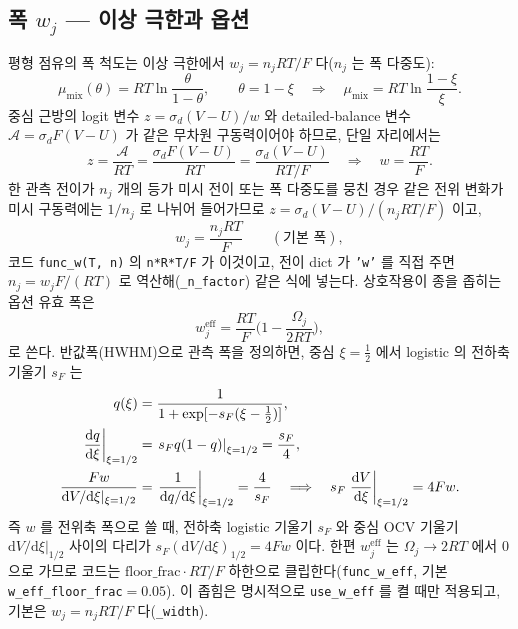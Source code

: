 \documentclass[11pt,a4paper]{article}
\newcommand{\dd}{\mathrm{d}}
\newcommand{\eff}{\mathrm{eff}}
\newcommand{\code}[1]{\texttt{#1}}
\begin{document}
\subsection{폭 $w_j$ — 이상 극한과 옵션}
평형 점유의 폭 척도는 이상 극한에서 $w_j=n_jRT/F$ 다($n_j$ 는 폭 다중도):
\begin{equation}
\mu_{\mathrm{mix}}(\theta)=RT\ln\frac{\theta}{1-\theta},\qquad
\theta=1-\xi
\quad\Longrightarrow\quad
\mu_{\mathrm{mix}}=RT\ln\frac{1-\xi}{\xi}.
\label{eq:wderiveA}
\end{equation}
중심 근방의 logit 변수 $z=\sigma_d(V-U)/w$ 와 detailed-balance 변수
$\mathcal A=\sigma_d F(V-U)$ 가 같은 무차원 구동력이어야 하므로, 단일 자리에서는
\begin{equation}
z=\frac{\mathcal A}{RT}
=\frac{\sigma_d F(V-U)}{RT}
=\frac{\sigma_d(V-U)}{RT/F}
\quad\Longrightarrow\quad
w=\frac{RT}{F}.
\label{eq:wderiveB}
\end{equation}
한 관측 전이가 $n_j$ 개의 등가 미시 전이 또는 폭 다중도를 뭉친 경우 같은 전위 변화가 미시 구동력에는 $1/n_j$ 로 나뉘어 들어가므로
$z=\sigma_d(V-U)/(n_jRT/F)$ 이고,
\begin{equation}
w_j=\frac{n_jRT}{F}\qquad(\text{기본 폭}),
\label{eq:wbase}
\end{equation}
코드 \code{func\_w(T, n)} 의 \code{n*R*T/F}
가 이것이고, 전이 dict 가 \code{'w'} 를 직접 주면 $n_j=w_jF/(RT)$ 로 역산해(\code{\_n\_factor}) 같은 식에 넣는다.
상호작용이 종을 좁히는 옵션 유효 폭은
\begin{equation}
w_j^\eff=\frac{RT}{F}\Big(1-\frac{\Omega_j}{2RT}\Big),
\label{eq:weff}
\end{equation}
로 쓴다. 반값폭(HWHM)으로 관측 폭을 정의하면, 중심 $\xi=\tfrac12$ 에서 logistic 의 전하축 기울기
$s_F$ 는
\begin{align}
q(\xi)&=\frac{1}{1+\exp[-s_F(\xi-\tfrac12)]},\notag\\
\left.\frac{\dd q}{\dd \xi}\right|_{\xi=1/2}
&=\left.s_F q(1-q)\right|_{\xi=1/2}
=\frac{s_F}{4},\notag\\
\frac{F w}{\dd V/\dd\xi|_{\xi=1/2}}
&=\left.\frac{1}{\dd q/\dd\xi}\right|_{\xi=1/2}
=\frac{4}{s_F}
\quad\Longrightarrow\quad
s_F\left.\frac{\dd V}{\dd\xi}\right|_{\xi=1/2}=4Fw .
\label{eq:weff_bridge}
\end{align}
즉 $w$ 를 전위축 폭으로 쓸 때, 전하축 logistic 기울기 $s_F$ 와 중심 OCV 기울기
$\dd V/\dd\xi|_{1/2}$ 사이의 다리가 $s_F(\dd V/\dd\xi)_{1/2}=4Fw$ 이다. 한편
$w_j^\eff$ 는 $\Omega_j\to2RT$ 에서 $0$ 으로 가므로 코드는 $\mathrm{floor\_frac}\cdot RT/F$ 하한으로 클립한다(\code{func\_w\_eff},
기본 \code{w\_eff\_floor\_frac}$=0.05$). 이 좁힘은 명시적으로 \code{use\_w\_eff} 를 켤 때만 적용되고, 기본은
$w_j=n_jRT/F$ 다(\code{\_width}).
\end{document}
